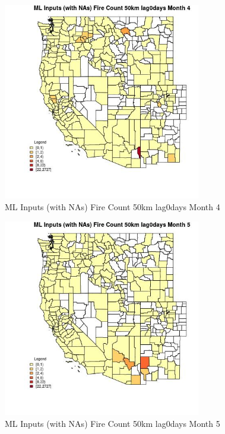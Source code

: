 \begin{figure} 
\centering  
\includegraphics[width=0.77\textwidth]{Code_Outputs/Report_ML_input_PM25_Step4_part_f_de_duplicated_aveswNAs_CountyFire_Count_50km_lag0daysmedianMonth4.jpg} 
\caption{\label{fig:Report_ML_input_PM25_Step4_part_f_de_duplicated_aveswNAsCountyFire_Count_50km_lag0daysmedianMonth4}ML Inputs (with NAs) Fire Count 50km lag0days Month 4} 
\end{figure} 
 

\begin{figure} 
\centering  
\includegraphics[width=0.77\textwidth]{Code_Outputs/Report_ML_input_PM25_Step4_part_f_de_duplicated_aveswNAs_CountyFire_Count_50km_lag0daysmedianMonth5.jpg} 
\caption{\label{fig:Report_ML_input_PM25_Step4_part_f_de_duplicated_aveswNAsCountyFire_Count_50km_lag0daysmedianMonth5}ML Inputs (with NAs) Fire Count 50km lag0days Month 5} 
\end{figure} 
 


